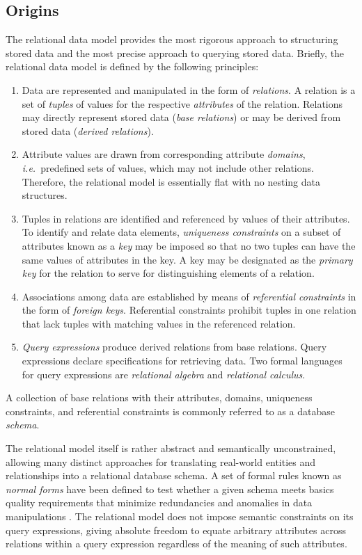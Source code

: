 \documentclass[a4paper,10pt]{article}
\begin{document}
\subsection{Origins}
The relational data model \citep{codd_relational_1970} provides the most rigorous approach to structuring stored data and the most precise approach to querying stored data.  
Briefly, the relational data model is defined by the following principles:
\begin{enumerate}
\item Data are represented and manipulated in the form of \emph{relations}. 
A relation is a set of \emph{tuples} of values for the respective \emph{attributes} of the relation.
Relations may directly represent stored data (\emph{base relations}) or may be derived from stored data (\emph{derived relations}).
\item Attribute values are drawn from corresponding attribute \emph{domains}, \emph{i.e.}\ predefined sets of values, which may not include other relations.
Therefore, the relational model is essentially flat with no nesting data structures.
\item Tuples in relations are identified and referenced by values of their attributes.
To identify and relate data elements, \emph{uniqueness constraints} on a subset of attributes known as a \emph{key} may be imposed so that no two tuples can have the same values of attributes in the key. A key may be designated as the \emph{primary key} for the relation to serve for distinguishing elements of a relation.
\item Associations among data are established by means of \emph{referential constraints} in the form of \emph{foreign keys}. 
Referential constraints prohibit tuples in one relation that lack tuples with matching values in the referenced relation. 
\item \emph{Query expressions} produce derived relations from base relations.  Query expressions declare specifications for retrieving data.
Two formal languages for query expressions are \emph{relational algebra} and \emph{relational calculus}.  
\end{enumerate}

A collection of base relations with their attributes, domains, uniqueness constraints, and referential constraints is commonly referred to as a database \emph{schema}.

The relational model itself is rather abstract and semantically unconstrained, allowing many distinct approaches for translating real-world entities and relationships into a relational database schema. 
A set of formal rules known as \emph{normal forms} have been defined to test whether a given schema meets basics quality requirements that minimize redundancies and anomalies in data manipulations \citep{kent-1983-simple}.
The relational model does not impose semantic constraints on its query expressions, giving absolute freedom to equate arbitrary attributes across relations within a query expression regardless of the meaning of such attributes.
\end{document}
